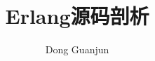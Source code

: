 \documentclass[a4paper, 11pt]{book}
\begin{document}
\title{Erlang源码剖析}
\author{Dong Guanjun}
\maketitle
\tableofcontents





\appendix


\newpage
\end{document}
